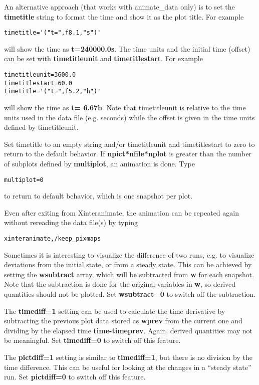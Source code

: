 \documentclass{article}
\begin{document}
An alternative approach (that works with animate\_data only) is to set the 
{\bf timetitle} string to format the time and show it as the plot title.
For example
\begin{verbatim}
timetitle='("t=",f8.1,"s")'
\end{verbatim}
will show the time as {\bf t=240000.0s}. The time units and the
initial time (offset) can be set with {\bf timetitleunit} 
and {\bf timetitlestart}. For example
\begin{verbatim}
timetitleunit=3600.0
timetitlestart=60.0
timetitle='("t=",f5.2,"h")'
\end{verbatim}
will show the time as {\bf t= 6.67h}. Note that timetitleunit is
relative to the time units used in the data file (e.g. seconds)
while the offset is given in the time units defined by timetitleunit.

Set timetitle to an empty string and/or timetitleunit and timetitlestart
to zero to return to the default behavior. 
If {\bf npict*nfile*nplot} is greater than the number 
of subplots defined by {\bf multiplot}, an animation is done. 
Type 
\begin{verbatim}
multiplot=0
\end{verbatim}
to return to default behavior, which is one snapshot per plot.

Even after exiting from Xinteranimate, the animation can be repeated
again without rereading the data file(s) by typing
\begin{verbatim}
xinteranimate,/keep_pixmaps
\end{verbatim}
Sometimes it is interesting to visualize the difference of two runs, e.g.
to visualize deviations from the initial state, or from a steady state.
This can be achieved by setting the {\bf wsubtract} array, which will be 
subtracted from {\bf w} for each snapshot. Note that the subtraction is
done for the original variables in {\bf w}, 
so derived quantities should not be plotted. 
Set {\bf wsubtract=0} to switch off the subtraction.

The {\bf timediff=1} setting can be used to calculate the time
derivative by subtracting the previous plot data stored as {\bf wprev}
from the current one and dividing by the elapsed time {\bf time-timeprev}. 
Again, derived quantities may not be meaningful.
Set {\bf timediff=0} to switch off this feature.

The {\bf pictdiff=1} setting is similar to {\bf timediff=1}, but there is
no division by the time difference. This can be useful for looking at
the changes in a ``steady state'' run. Set {\bf pictdiff=0} to switch off this
feature.
\end{document}
